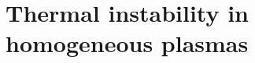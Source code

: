 \chapter{Thermal instability in homogeneous plasmas} \label{ch: homogeneous_plasmas}


\cleardoublepage
